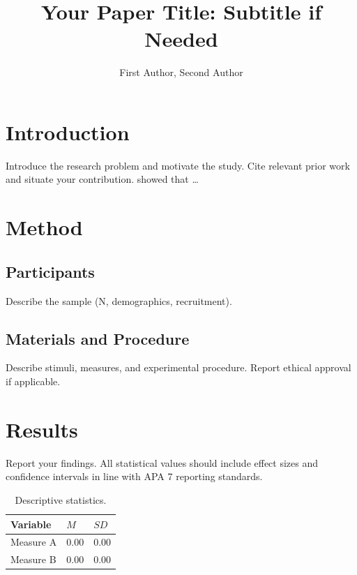 \documentclass[man, 12pt, a4paper]{apa7}
\title{Your Paper Title: Subtitle if Needed}
\author{First Author, Second Author}
\affiliation{Department of Linguistics, Universität zu Köln}
\begin{document}
\maketitle

\section{Introduction}

Introduce the research problem and motivate the study.
Cite relevant prior work \parencite{AuthorYearShortTitle}
and situate your contribution.
\textcite{AuthorYearShortTitle} showed that \ldots

\section{Method}

\subsection{Participants}

Describe the sample (N, demographics, recruitment).

\subsection{Materials and Procedure}

Describe stimuli, measures, and experimental procedure.
Report ethical approval if applicable.

\section{Results}

Report your findings.
All statistical values should include effect sizes and confidence intervals
in line with APA 7 reporting standards.

\begin{table}[htbp]
  \centering
  \caption{Descriptive statistics.}
  \label{tab:descriptives}
  \begin{tabularx}{\linewidth}{lXX}
    \toprule
    Variable & $M$ & $SD$ \\
    \midrule
    Measure A & 0.00 & 0.00 \\
    Measure B & 0.00 & 0.00 \\
    \bottomrule
  \end{tabularx}
\end{table}
\end{document}
